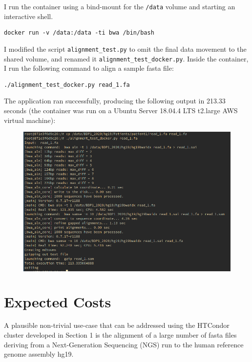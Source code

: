 \documentclass{article}
\begin{document}
I run the container using a bind-mount for the \texttt{/data} volume and starting an interactive shell.

\begin{lstlisting}
docker run -v /data:/data -ti bwa /bin/bash
\end{lstlisting}

I modified the script \texttt{alignment\_test.py} to omit the final data movement to the shared volume, and renamed it \texttt{alignment\_test\_docker.py}.
Inside the container, I run the following command to align a sample fasta file:

\begin{lstlisting}
./alignment_test_docker.py read_1.fa
\end{lstlisting}

The application ran successfully, producing the following output in 213.33 seconds (the container was run on a Ubuntu Server 18.04.4 LTS t2.large AWS virtual machine):

\begin{figure}[!h]
    \center
    \includegraphics[width=\textwidth]{./images/docker_test_out.png}
\end{figure}

\FloatBarrier

\section{Expected Costs}
A plausible non-trivial use-case that can be addressed using the HTCondor cluster developed in Section 1 is the alignment of a large number of fasta files deriving from a Next-Generation Sequencing (NGS) run to the human reference genome assembly hg19.
\end{document}
